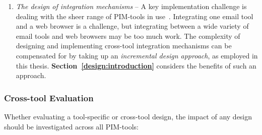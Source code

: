 \begin{enumerate}
\item \textit{The design of integration mechanisms} -- A key implementation challenge is dealing with the sheer range of PIM-tools in use~\citep{Bellotti:00}.  Integrating one email tool and a web browser is a challenge, but integrating between a wide variety of email tools and web browsers may be too much work.
The complexity of designing and implementing cross-tool integration mechanisms can be compensated for by taking up an \textit{incremental design approach}, as employed in this thesis.  \textbf{Section~\ref{design:introduction}} considers the benefits of such an approach.  %




\end{enumerate}




\subsubsection{Cross-tool Evaluation}

Whether evaluating a tool-specific or cross-tool design, the impact of any design should be investigated across all PIM-tools:

